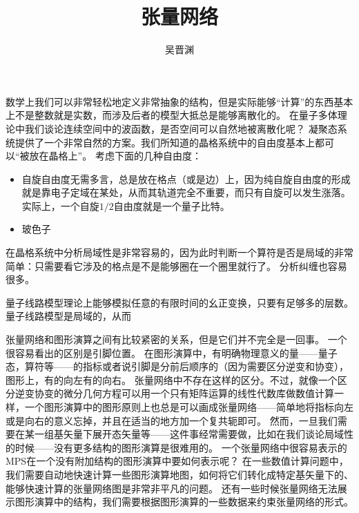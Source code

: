 \documentclass[hyperref, UTF8, a4paper]{ctexart}
\title{张量网络}
\author{吴晋渊}
\begin{document}
\maketitle

数学上我们可以非常轻松地定义非常抽象的结构，但是实际能够“计算”的东西基本上不是整数就是实数，而涉及后者的模型大抵总是能够离散化的。
在量子多体理论中我们谈论连续空间中的波函数，是否空间可以自然地被离散化呢？
凝聚态系统提供了一个非常自然的方案。我们所知道的晶格系统中的自由度基本上都可以“被放在晶格上”。
考虑下面的几种自由度：
\begin{itemize}
    \item 自旋自由度无需多言，总是放在格点（或是边）上，因为纯自旋自由度的形成就是靠电子定域在某处，从而其轨道完全不重要，而只有自旋可以发生涨落。
    实际上，一个自旋$1/2$自由度就是一个量子比特。
    \item 玻色子
\end{itemize}

在晶格系统中分析局域性是非常容易的，因为此时判断一个算符是否是局域的非常简单：只需要看它涉及的格点是不是能够圈在一个圈里就行了。
分析纠缠也容易很多。

量子线路模型理论上能够模拟任意的有限时间的幺正变换，只要有足够多的层数。
量子线路模型是局域的，从而

张量网络和图形演算之间有比较紧密的关系，但是它们并不完全是一回事。
一个很容易看出的区别是引脚位置。
在图形演算中，有明确物理意义的量——量子态，算符等——的指标或者说引脚是分前后顺序的（因为需要区分逆变和协变），图形上，有的向左有的向右。
张量网络中不存在这样的区分。不过，就像一个区分逆变协变的微分几何方程可以用一个只有矩阵运算的线性代数库做数值计算一样，一个图形演算中的图形原则上也总是可以画成张量网络——简单地将指标向左或是向右的意义忘掉，并且在适当的地方加一个复共轭即可。
然而，一旦我们需要在某一组基矢量下展开态矢量等——这件事经常需要做，比如在我们谈论局域性的时候——没有更多结构的图形演算是很难用的。
一个张量网络中很容易表示的MPS在一个没有附加结构的图形演算中要如何表示呢？
在一些数值计算问题中，我们需要自动地快速计算一些图形演算地图，如何将它们转化成特定基矢量下的、能够快速计算的张量网络图是非常非平凡的问题。
还有一些时候张量网络无法展示图形演算中的结构，我们需要根据图形演算的一些数据来约束张量网络的形式。
\end{document}
